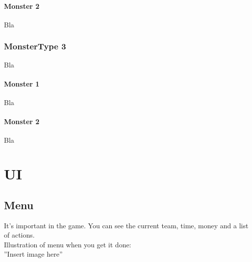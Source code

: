 \documentclass[a4paper,12pt]{book}
\begin{document}
\subsubsection{Monster 2}
Bla
\subsection{MonsterType 3}
Bla
\subsubsection{Monster 1}
Bla
\subsubsection{Monster 2}
Bla
\chapter{UI}
\section{Menu}
It's important in the game. You can see the current team, time, money and a list of actions. \\ Illustration of menu when you get it done: \\ ''Insert image here''
\end{document}
